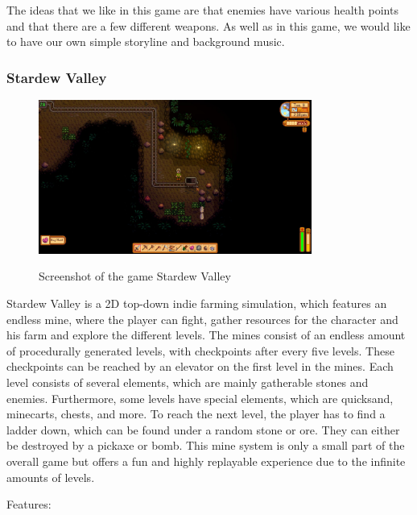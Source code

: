 \documentclass[12p]{article}
\begin{document}
The ideas that we like in this game are that enemies have various health points and that there are a few different weapons. As well as in this game, we would like to have our own simple storyline and background music.


\newpage
\subsubsection[Stardew Valley]{Stardew Valley \cite{StardewValley}} \label{StardewValley}

\begin{figure}[ht]
  \center
  \includegraphics[width=0.8\textwidth]{StateOfTheArtScreenshots/stardew_valley}
  \label{sec:StateOfTheArt_Screenshots_StardewValley}
  \caption{Screenshot of the game Stardew Valley \cite{StardewValleyScreenshot}}
\end{figure}

Stardew Valley is a 2D top-down indie farming simulation, which features an endless mine, where the player can fight, gather resources for the character and his farm and explore the different levels. The mines consist of an endless amount of procedurally generated levels, with checkpoints after every five levels. These checkpoints can be reached by an elevator on the first level in the mines. Each level consists of several elements, which are mainly gatherable stones and enemies. Furthermore, some levels have special elements, which are quicksand, minecarts, chests, and more. To reach the next level, the player has to find a ladder down, which can be found under a random stone or ore. They can either be destroyed by a pickaxe or bomb. This mine system is only a small part of the overall game but offers a fun and highly replayable experience due to the infinite amounts of levels.

Features:
\end{document}
